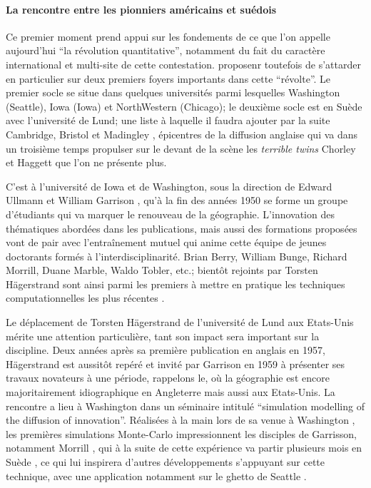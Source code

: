 \paragraph{La rencontre entre les pionniers américains et suédois}

Ce premier moment prend appui sur les fondements de ce que l'on appelle aujourd'hui \enquote{la révolution quantitative}, notamment du fait du caractère international et multi-site de cette contestation. \textcite{Gould2004} proposenr toutefois de s'attarder en particulier sur deux premiers foyers importants dans cette \enquote{révolte}. Le premier socle se situe dans quelques universités \autocite{Gould2004} parmi lesquelles Washington (Seattle), Iowa (Iowa) et NorthWestern (Chicago); le deuxième socle est en Suède avec l'université de Lund; une liste à laquelle il faudra ajouter par la suite Cambridge, Bristol et Madingley \autocite{Haggett1989}, épicentres de la diffusion anglaise \autocites{Whitehand1970} qui va dans un troisième temps propulser sur le devant de la scène les \textit{terrible twins} Chorley et Haggett que l'on ne présente plus.

C'est à l'université de Iowa et de Washington, sous la direction de Edward Ullmann et William Garrison , qu'à la fin des années 1950 se forme un groupe d'étudiants qui va marquer le renouveau de la géographie. L'innovation des thématiques abordées dans les publications, mais aussi des formations proposées vont de pair avec l’entraînement mutuel qui anime cette équipe de jeunes doctorants formés à l'interdisciplinarité. Brian Berry, William Bunge, Richard Morrill, Duane Marble, Waldo Tobler, etc.; bientôt rejoints par Torsten Hägerstrand sont ainsi parmi les premiers à mettre en pratique les techniques computationnelles les plus récentes .

Le déplacement de Torsten Hägerstrand de l'université de Lund aux Etats-Unis mérite une attention particulière, tant son impact sera important sur la discipline. Deux années après sa première publication en anglais en 1957, Hägerstrand est aussitôt repéré et invité par Garrison en 1959 à présenter ses travaux novateurs à une période, rappelons le, où la géographie est encore majoritairement idiographique en Angleterre mais aussi aux Etats-Unis. La rencontre a lieu à Washington dans un séminaire intitulé \foreignquote{english}{simulation modelling of the diffusion of innovation}. Réalisées à la main lors de sa venue à Washington , les premières simulations Monte-Carlo  impressionnent les disciples de Garrisson, notamment Morrill \autocite[120]{Unwin1992}, qui à la suite de cette expérience va partir plusieurs mois en Suède \autocite{Morril2005}, ce qui lui inspirera d'autres développements s'appuyant sur cette technique, avec une application notamment sur le ghetto de Seattle \autocite{Marble1972}.

